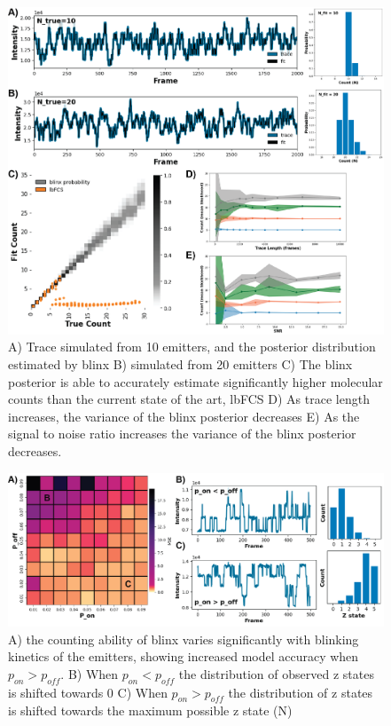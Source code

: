 \documentclass[twocolumn]{article}
\begin{document}
\begin{figure}
  \includegraphics[width=\linewidth]{figures/fig_2.png}
  \caption{A) Trace simulated from 10 emitters, and the posterior distribution estimated by blinx B) simulated from 20 emitters
  C) The blinx posterior is able to accurately estimate significantly higher molecular counts than the current state of the art, lbFCS
  D) As trace length increases, the variance of the blinx posterior decreases E) As the signal to noise ratio increases the variance of 
  the blinx posterior decreases. }
  \label{fig:method:overview}
\end{figure}

\begin{figure}
  \includegraphics[width=\linewidth]{figures/fig_3.png}
  \caption{A) the counting ability of blinx varies significantly with blinking kinetics of the emitters, showing increased model accuracy when
   $p_{on} > p_{off}$. B) When $p_{on} < p_{off}$ the distribution of observed z states is shifted towards 0 C) When $p_{on} > p_{off}$ the 
   distribution of z states is shifted towards the maximum possible z state (N)}
  \label{fig:method:overview}
\end{figure}



{
  \small
  
  
}

\clearpage
% 
\end{document}
